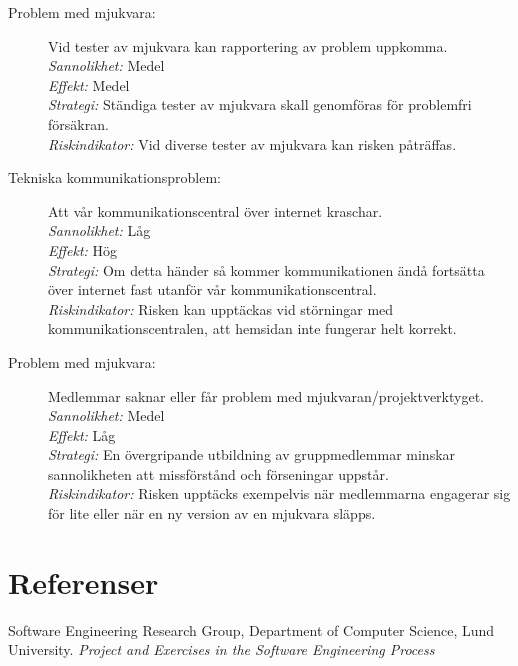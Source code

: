 \documentclass[a4paper]{article}
\begin{document}
\begin{description}
\item[Problem med mjukvara:]
Vid tester av mjukvara kan rapportering av problem uppkomma. \\
\emph{Sannolikhet:}
Medel \\
\emph{Effekt:}
Medel \\
\emph{Strategi:}
Ständiga tester av mjukvara skall genomföras för problemfri försäkran. \\
\emph{Riskindikator:}
Vid diverse tester av mjukvara kan risken påträffas.

\item[Tekniska kommunikationsproblem:]
Att vår kommunikationscentral över internet kraschar. \\
\emph{Sannolikhet:}
Låg \\
\emph{Effekt:}
Hög \\
\emph{Strategi:}
Om detta händer så kommer kommunikationen ändå fortsätta över internet fast
 utanför vår kommunikationscentral. \\
\emph{Riskindikator:}
Risken kan upptäckas vid störningar med kommunikationscentralen, att hemsidan
 inte fungerar helt korrekt.
 
 \item[Problem med mjukvara:]
Medlemmar saknar eller får problem med mjukvaran/projektverktyget. \\
\emph{Sannolikhet:}
Medel \\
\emph{Effekt:}
Låg \\
\emph{Strategi:}
En övergripande utbildning av gruppmedlemmar minskar sannolikheten att missförstånd och förseningar uppstår. \\
\emph{Riskindikator:}
Risken upptäcks exempelvis när medlemmarna engagerar sig för lite eller när en ny version av en mjukvara släpps.
\end{description}
\section{Referenser}
\renewcommand*{\refname}{}
\vspace{-1cm} %

\begin{thebibliography}{99}
 Software Engineering Research Group, Department of Computer Science, Lund University. \emph{Project and Exercises in the Software Engineering Process}
\end{thebibliography}
\end{document}
